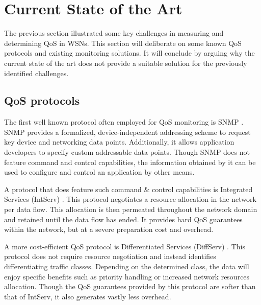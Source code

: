 
\section{Current State of the Art}
The previous section illustrated some key challenges in measuring and determining QoS in WSNs. This section will deliberate on some known QoS protocols and existing monitoring solutions. It will conclude by arguing why the current state of the art does not provide a suitable solution for the previously identified challenges.

\subsection{QoS protocols}
\label{sec:qos-protocols}
The first well known protocol often employed for QoS monitoring is SNMP \cite{snmp}. SNMP provides a formalized, device-independent addressing scheme to request key device and networking data points. Additionally, it allows application developers to specify custom addressable data points. Though SNMP does not feature command and control capabilities, the information obtained by it can be used to configure and control an application by other means.

A protocol that does feature such command \& control capabilities is Integrated Services (IntServ) \cite{intserv_diffserv_uitleg}. This protocol negotiates a resource allocation in the network per data flow. This allocation is then permeated throughout the network domain and retained until the data flow has ended. It provides hard QoS guarantees within the network, but at a severe preparation cost and overhead.

A more cost-efficient QoS protocol is Differentiated Services (DiffServ) \cite{intserv_diffserv_uitleg}. This protocol does not require resource negotiation and instead identifies differentiating traffic classes. Depending on the determined class, the data will enjoy specific benefits such as priority handling or increased network resources allocation. Though the QoS guarantees provided by this protocol are softer than that of IntServ, it also generates vastly less overhead.

